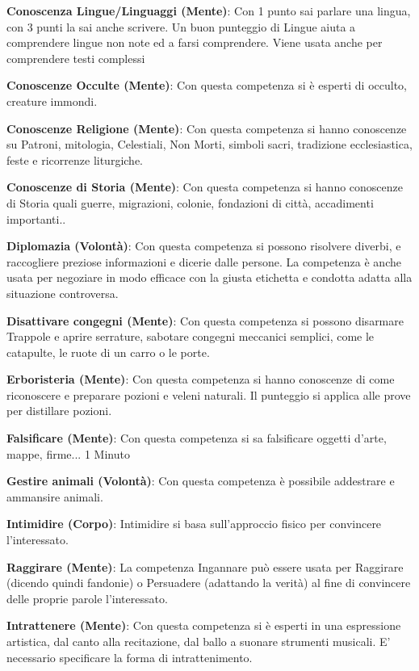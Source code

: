 \documentclass[12pt,a4paper,twoside,openany]{book}
\begin{document}
\begin{multicols}{2}
\textbf{Conoscenza Lingue/Linguaggi (Mente)}: Con 1 punto sai parlare una lingua, con 3 punti la sai anche scrivere. Un buon punteggio di Lingue aiuta a comprendere lingue non note ed a farsi comprendere. Viene usata anche per comprendere testi complessi

\textbf{Conoscenze Occulte (Mente)}: Con questa competenza si è esperti di occulto, creature immondi. 

\textbf{Conoscenze Religione (Mente)}: Con questa competenza si hanno conoscenze su Patroni, mitologia, Celestiali, Non Morti, simboli sacri, tradizione ecclesiastica, feste e ricorrenze liturgiche. 

\textbf{Conoscenze di Storia (Mente)}: Con questa competenza si hanno conoscenze di Storia quali guerre, migrazioni, colonie, fondazioni di città, accadimenti importanti..

\textbf{Diplomazia (Volontà)}: Con questa competenza si possono risolvere diverbi, e raccogliere preziose informazioni e dicerie dalle persone. La competenza è anche usata per negoziare in modo efficace con la giusta etichetta e condotta adatta alla situazione controversa. 

\textbf{Disattivare congegni (Mente)}: Con questa competenza si possono disarmare Trappole e aprire serrature, sabotare congegni meccanici semplici, come le catapulte, le ruote di un carro o le porte.

\textbf{Erboristeria (Mente)}: Con questa competenza si hanno conoscenze di come riconoscere e preparare pozioni e veleni naturali. Il punteggio si applica alle prove per distillare pozioni.

\textbf{Falsificare (Mente)}: Con questa competenza si sa falsificare oggetti d'arte, mappe, firme... 1 Minuto

\textbf{Gestire animali (Volontà)}: Con questa competenza è possibile addestrare e ammansire animali.

\textbf{Intimidire (Corpo)}: Intimidire si basa sull'approccio fisico per convincere l'interessato. 

\textbf{Raggirare (Mente)}: La competenza Ingannare può essere usata per Raggirare (dicendo quindi fandonie) o Persuadere (adattando la verità) al fine di convincere delle proprie parole l'interessato.

\textbf{Intrattenere (Mente)}: Con questa competenza si è esperti in una espressione artistica, dal canto alla recitazione, dal ballo a suonare strumenti musicali. E' necessario specificare la forma di intrattenimento.


\end{multicols}
\end{document}

